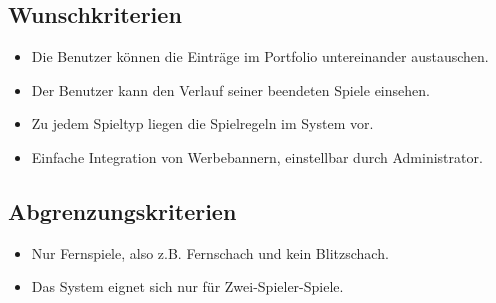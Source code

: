 \subsection{Wunschkriterien}

\begin{itemize}
	\item Die Benutzer können die Einträge im Portfolio untereinander austauschen.
	\item Der Benutzer kann den Verlauf seiner beendeten Spiele einsehen.
	\item Zu jedem Spieltyp liegen die Spielregeln im System vor.
	\item Einfache Integration von Werbebannern, einstellbar durch Administrator.
\end{itemize}

\subsection{Abgrenzungskriterien}

\begin{itemize}
	\item Nur Fernspiele, also z.B. Fernschach und kein Blitzschach.
	\item Das System eignet sich nur für Zwei-Spieler-Spiele.
\end{itemize}
